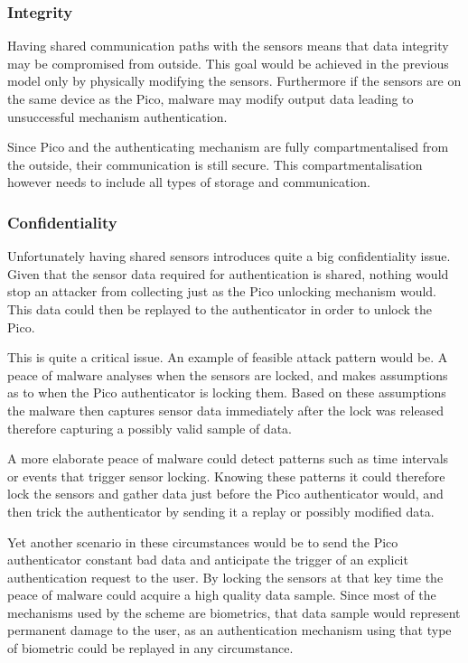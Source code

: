 	\subsubsection*{Integrity}
	Having shared communication paths with the sensors means that data integrity may be compromised from outside. This goal would be achieved in the previous model only by physically modifying the sensors. Furthermore if the sensors are on the same device as the Pico, malware may modify output data leading to unsuccessful mechanism authentication.
	
	Since Pico and the authenticating mechanism are fully compartmentalised from the outside, their communication is still secure. This compartmentalisation however needs to include all types of storage and communication.

	\subsubsection*{Confidentiality}
	Unfortunately having shared sensors introduces quite a big confidentiality issue. Given that the sensor data required for authentication is shared, nothing would stop an attacker from collecting just as the Pico unlocking mechanism would. This data could then be replayed to the authenticator in order to unlock the Pico. 
	
	This is quite a critical issue. An example of feasible attack pattern would be. A peace of malware analyses when the sensors are locked, and makes assumptions as to when the Pico authenticator is locking them. Based on these assumptions the malware then captures sensor data immediately after the lock was released therefore capturing a possibly valid sample of data. 
	
	A more elaborate peace of malware could detect patterns such as time intervals or events that trigger sensor locking. Knowing these patterns it could therefore lock the sensors and gather data just before the Pico authenticator would, and then trick the authenticator by sending it a replay or possibly modified data.
	
	Yet another scenario in these circumstances would be to send the Pico authenticator constant bad data and anticipate the trigger of an explicit authentication request to the user. By locking the sensors at that key time the peace of malware could acquire a high quality data sample. Since most of the mechanisms used by the scheme are biometrics, that data sample would represent permanent damage to the user, as an authentication mechanism using that type of biometric could be replayed in any circumstance. 
	

